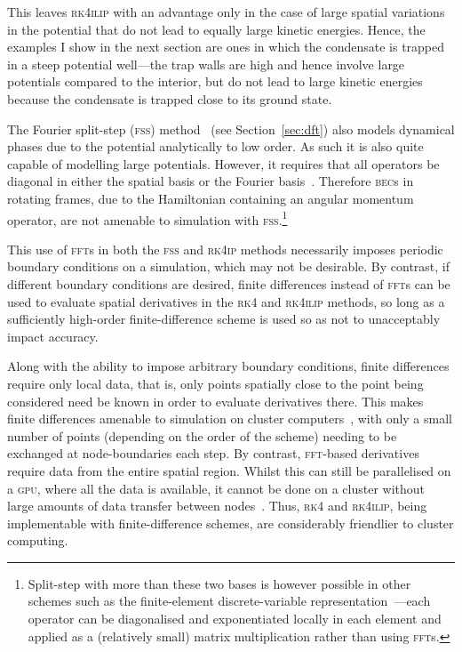 This leaves \textsc{rk4ilip} with an advantage only in the case of large spatial variations in the potential that do not lead to equally large kinetic energies. Hence, the examples I show in the next section are ones in which the condensate is trapped in a steep potential well---the trap walls are high and hence involve large potentials compared to the interior, but do not lead to large kinetic energies because the condensate is trapped close to its ground state.

The Fourier split-step (\textsc{fss}) method~\cite{Muslu2005} (see Section~\ref{sec:dft}) also models dynamical phases due to the potential analytically to low order. As such it is also quite capable of modelling large potentials. However, it requires that all operators be diagonal in either the spatial basis or the Fourier basis~\cite{Muslu2005}. Therefore \textsc{bec}s in rotating frames, due to the Hamiltonian containing an angular momentum operator, are not amenable to simulation with \textsc{fss}.\footnote{Split-step with more than these two bases is however possible in other schemes such as the finite-element discrete-variable representation~\cite{schneider_parallel_2006}---each operator can be diagonalised and exponentiated locally in each element and applied as a (relatively small) matrix multiplication rather than using \textsc{fft}s.}

This use of \textsc{fft}s in both the \textsc{fss} and \textsc{rk4ip} methods necessarily imposes periodic boundary conditions on a simulation, which may not be desirable. By contrast, if different boundary conditions are desired, finite differences instead of \textsc{fft}s can be used to evaluate spatial derivatives in the \textsc{rk4} and \textsc{rk4ilip} methods, so long as a sufficiently high-order finite-difference scheme is used so as not to unacceptably impact accuracy.

Along with the ability to impose arbitrary boundary conditions, finite differences require only local data, that is, only points spatially close to the point being considered need be known in order to evaluate derivatives there. This makes finite differences amenable to simulation on cluster computers~\cite[p.~100]{heroux2006parallel}, with only a small number of points (depending on the order of the scheme) needing to be exchanged at node-boundaries each step. By contrast, \textsc{fft}-based derivatives require data from the entire spatial region. Whilst this can still be parallelised on a \textsc{gpu}, where all the data is available, it cannot be done on a cluster without large amounts of data transfer between nodes~\cite{Gupta93thescalability}. Thus, \textsc{rk4} and \textsc{rk4ilip}, being implementable with finite-difference schemes, are considerably friendlier to cluster computing.

